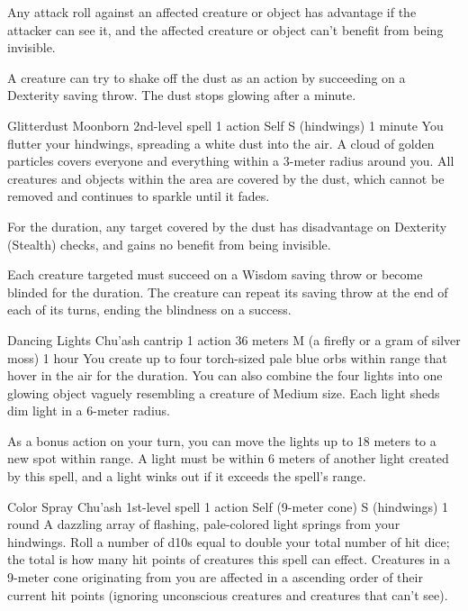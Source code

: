 Any attack roll against an affected creature or object has advantage if the attacker can see it, and the affected creature or object can't benefit from being invisible.

A creature can try to shake off the dust as an action by succeeding on a Dexterity saving throw.
The dust stops glowing after a minute.

\DndSpellHeader %
    {Glitterdust \label{spell::glitterdust}}
    {Moonborn 2nd-level spell}
    {1 action}
    {Self}
    {S (hindwings)}
    {1 minute}
You flutter your hindwings, spreading a white dust into the air.
A cloud of golden particles covers everyone and everything within a 3-meter radius around you.
All creatures and objects within the area are covered by the dust, which cannot be removed and continues to sparkle until it fades.

For the duration, any target covered by the dust has disadvantage on Dexterity (Stealth) checks, and gains no benefit from being invisible.

Each creature targeted must succeed on a Wisdom saving throw or become blinded for the duration.
The creature can repeat its saving throw at the end of each of its turns, ending the blindness on a success.

\DndSpellHeader %
    {Dancing Lights \label{spell::dancinglights}}
    {Chu'ash cantrip}
    {1 action}
    {36 meters}
    {M (a firefly or a gram of silver moss)}
    {1 hour}
You create up to four torch-sized pale blue orbs within range that hover in the air for the duration.
You can also combine the four lights into one glowing object vaguely resembling a creature of Medium size.
Each light sheds dim light in a 6-meter radius.

As a bonus action on your turn, you can move the lights up to 18 meters to a new spot within range.
A light must be within 6 meters of another light created by this spell, and a light winks out if it exceeds the spell's range.

\DndSpellHeader %
    {Color Spray \label{spell::colorspray}}
    {Chu'ash 1st-level spell}
    {1 action}
    {Self (9-meter cone)}
    {S (hindwings)}
    {1 round}
A dazzling array of flashing, pale-colored light springs from your hindwings.
Roll a number of d10s equal to double your total number of hit dice; the total is how many hit points of creatures this spell can effect.
Creatures in a 9-meter cone originating from you are affected in a ascending order of their current hit points (ignoring unconscious creatures and creatures that can't see).

